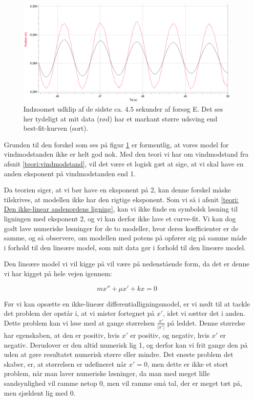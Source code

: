 \begin{figure}[h]
\center
\includegraphics[scale=0.5]{Figurer/Kurvefejl}
\caption{Indzoomet udklip af de sidste ca. $4.5$ sekunder af forsøg E. Det ses her tydeligt  at mit data (rød) har et markant større udsving end best-fit-kurven (sort).}
\label{fig: Fejlkurve exp2}
\end{figure}

Grunden til den forskel som ses på figur \ref{fig: Fejlkurve exp2} er formentlig, at vores model for vindmodstanden ikke er helt god nok. 
Med den teori vi har om vindmodstand fra afsnit \ref{teori:vindmodstand}, vil det være et logisk gæt at sige, at vi skal have en anden eksponent på vindmodstanden end 1. 

Da teorien siger, at vi bør have en eksponent på 2, kan denne forskel måske tilskrives, at modellen ikke har den rigtige eksponent.
Som vi så i afsnit \ref{teori: Den ikke-linear andenordens ligning}, kan vi ikke finde en symbolsk løsning til ligningen med eksponent 2, og vi kan derfor ikke lave et curve-fit. 
Vi kan dog godt lave numeriske løsninger for de to modeller, hvor deres koefficienter er de samme, og så observere, om modellen med potens på opfører sig på samme måde i forhold til den lineære model, som mit data gør i forhold til den lineære model.

Den lineære model vi vil kigge på vil være på nedenstående form, da det er denne vi har kigget på hele vejen igennem:

\begin{equation}
mx'' + \mu x' + kx = 0
\label{eq: standard linear diff}
\end{equation}
 

Før vi kan opsætte en ikke-lineær differentialligningsmodel, er vi nødt til at tackle det problem der opstår i, at vi mister fortegnet på $x'$, idet vi sætter det i anden.
Dette problem kan vi løse med at gange størrelsen $\frac{x'}{|x'|}$ på leddet. 
Denne størrelse har egenskaben, at den er positiv, hvis $x'$ er positiv, og negativ, hvis $x'$ er negativ. 
Derudover er den altid numerisk lig 1, og derfor kan vi frit gange den på uden at gøre resultatet numerisk større eller mindre. 
Det eneste problem det skaber, er, at størrelsen er udefineret når $x'=0$, men dette er ikke et stort problem, når man laver numeriske løsninger, da man med meget lille sandsynlighed vil ramme netop 0, men vil ramme små tal, der er meget tæt på, men sjældent lig med 0. 

